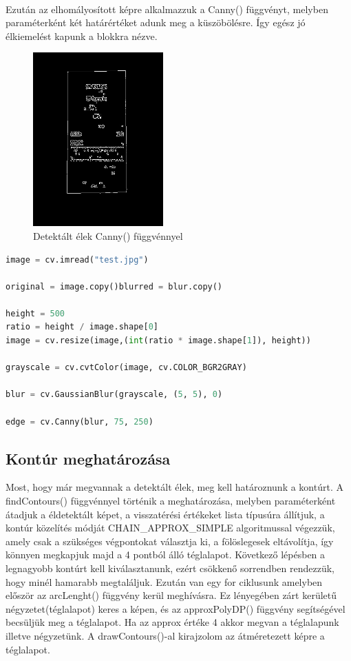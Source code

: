 \documentclass[a4paper,12pt]{article}
\begin{document}
\\Ezután az elhomályosított képre alkalmazzuk a Canny() függvényt, melyben paraméterként két határértéket adunk meg a küszöbölésre. Így egész jó élkiemelést kapunk a blokkra nézve. 
\begin{figure}[h]
	\centering
	\includegraphics[width=5cm]{4d_cannyedged}
	\caption{Detektált élek Canny() függvénnyel}
\end{figure}
\begin{lstlisting}[language=Python, caption=Alapvető műveletek elvégzése]
image = cv.imread("test.jpg")

original = image.copy()blurred = blur.copy()

height = 500
ratio = height / image.shape[0]
image = cv.resize(image,(int(ratio * image.shape[1]), height))

grayscale = cv.cvtColor(image, cv.COLOR_BGR2GRAY)

blur = cv.GaussianBlur(grayscale, (5, 5), 0)

edge = cv.Canny(blur, 75, 250)
\end{lstlisting}

\subsection{Kontúr meghatározása}

Most, hogy már megvannak a detektált élek, meg kell határoznunk a kontúrt. A findContours() függvénnyel történik a meghatározása, melyben paraméterként átadjuk a éldetektált képet, a visszatérési értékeket lista típusúra állítjuk, a kontúr közelítés módját CHAIN{\_}APPROX{\_}SIMPLE algoritmussal végezzük, amely csak a szükséges végpontokat választja ki, a fölöslegesek eltávolítja, így könnyen megkapjuk majd a 4 pontból álló téglalapot. Következő lépésben a legnagyobb kontúrt kell kiválasztanunk, ezért csökkenő sorrendben rendezzük, hogy minél hamarabb megtaláljuk. Ezután van egy for ciklusunk amelyben először az arcLenght() függvény kerül meghívásra. Ez lényegében zárt kerületű négyzetet(téglalapot) keres a képen, és az approxPolyDP() függvény segítségével becsüljük meg a téglalapot. Ha az approx értéke 4 akkor megvan a téglalapunk illetve négyzetünk. A drawContours()-al kirajzolom az átméretezett képre a téglalapot.
\end{document}

